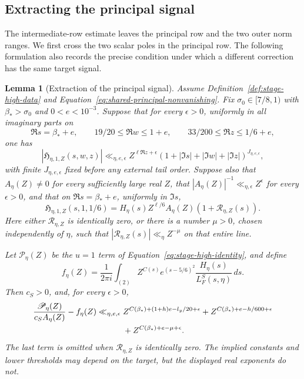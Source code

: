 \documentclass[11pt,a4paper]{article}
\numberwithin{equation}{section}
\numberwithin{figure}{section}
\newtheorem{lemma}[theorem]{Lemma}
\theoremstyle{definition}
\theoremstyle{remark}
\begin{document}
\subsection{Extracting the principal signal}

The intermediate-row estimate leaves the principal row and the two outer
norm ranges.  We first cross the two scalar poles in the principal row.
The following formulation also records the precise condition under which
a different correction has the same target signal.

\begin{lemma}[Extraction of the principal signal]
\label{lem:principal-residue-interface}
Assume Definition~\ref{def:stage-high-data} and
Equation~\eqref{eq:shared-principal-nonvanishing}.  Fix
$\sigma_0\in[7/8,1)$ with $\beta_*>\sigma_0$ and $0<e<10^{-3}$.
Suppose that for every $\epsilon>0$, uniformly in all imaginary parts on
\[
 \Re s=\beta_*+e,\qquad 19/20\le\Re w\le1+e,
 \qquad 33/200\le\Re z\le1/6+e,
\]
one has
\begin{equation}
 |\mathfrak H_{\eta,1,Z}(s,w,z)|
 \ll_{\eta,e,\epsilon} Z^{\ell\Re z+\epsilon}
  (1+|\Im s|+|\Im w|+|\Im z|)^{J_{\eta,e,\epsilon}},
 \label{eq:principal-correction-bound}
\end{equation}
with finite $J_{\eta,e,\epsilon}$ fixed before any external tail order.
Suppose also that $A_\eta(Z)\ne0$ for every sufficiently large real $Z$,
that $|A_\eta(Z)|^{-1}\ll_{\eta,\epsilon}Z^\epsilon$ for every
$\epsilon>0$, and that on $\Re s=\beta_*+e$, uniformly in $\Im s$,
\begin{equation}
 \mathfrak H_{\eta,1,Z}(s,1,1/6)
 =H_\eta(s)Z^{\ell/6}A_\eta(Z)(1+\mathcal R_{\eta,Z}(s)).
 \label{eq:principal-correction-residue}
\end{equation}
Here either $\mathcal R_{\eta,Z}$ is identically zero, or there is a number
$\mu>0$, chosen independently of $\eta$, such that
$|\mathcal R_{\eta,Z}(s)|\ll_\eta Z^{-\mu}$ on that entire line.

Let $\mathscr P_\eta(Z)$ be the $u=1$ term of
Equation~\eqref{eq:stage-high-identity}, and define
\[
 f_\eta(Z)=\frac1{2\pi i}\int_{(2)}
    Z^{C(s)}e^{(s-5/6)^2}\frac{H_\eta(s)}{L_F^S(s,\eta)}\,ds.
\]
Then $c_S>0$, and, for every $\epsilon>0$,
\begin{align}
 \frac{\mathscr P_\eta(Z)}{c_SA_\eta(Z)}-f_\eta(Z)
 \ll_{\eta,e,\epsilon}{}&
 Z^{C(\beta_*)+(1+h)e-l_y/20+\epsilon}
 +Z^{C(\beta_*)+e-h/600+\epsilon}\notag\\
 &+Z^{C(\beta_*)+e-\mu+\epsilon}.
 \label{eq:principal-remainder-bound}
\end{align}
The last term is omitted when $\mathcal R_{\eta,Z}$ is identically zero.
The implied constants and lower thresholds may depend on the target, but
the displayed real exponents do not.
\end{lemma}
\end{document}
